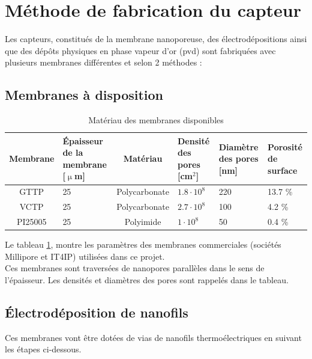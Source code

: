 \section{Méthode de fabrication du capteur}
\label{chap:capteur}
Les capteurs, constitués de la membrane nanoporeuse, des électrodépositions ainsi que des dépôts physiques en phase vapeur d'or (\gls{pvd}) sont 
fabriquées avec plusieurs membranes différentes et selon 2 méthodes :

\subsection{Membranes à disposition}
\begin{table}[H]
    \centering
    \begin{tabular}{|c|p{3cm}|c|p{3cm}|p{2cm}|p{2cm}|}
        \hline
        Membrane & Épaisseur de la membrane [$\upmu$m] & Matériau      & Densité des pores [cm$^2$] & Diamètre des pores [nm] & Porosité de surface \\
        \hline
        GTTP     & 25                                  & Polycarbonate & $1.8 \cdot 10^8$           & 220                     & 13.7 \%             \\
        \hline
        VCTP     & 25                                  & Polycarbonate & $2.7 \cdot 10^8$           & 100                     & 4.2 \%              \\
        \hline
        PI25005  & 25                                  & Polyimide     & $1 \cdot 10^8$             & 50                      & 0.4 \%              \\
        \hline
    \end{tabular}
    \caption{Matériau des membranes disponibles}
    \label{tab:membranes}
\end{table}

Le tableau \ref{tab:membranes}, montre les paramètres des membranes commerciales (sociétés Millipore et IT4IP) utilisées dans ce projet.\\
Ces membranes sont traversées de nanopores parallèles dans le sens de l'épaisseur. Les densités et diamètres des pores sont rappelés dans le 
tableau. 

\subsection{Électrodéposition de nanofils}
Ces membranes vont être dotées de vias de nanofils thermoélectriques en suivant les étapes ci-dessous. \\

